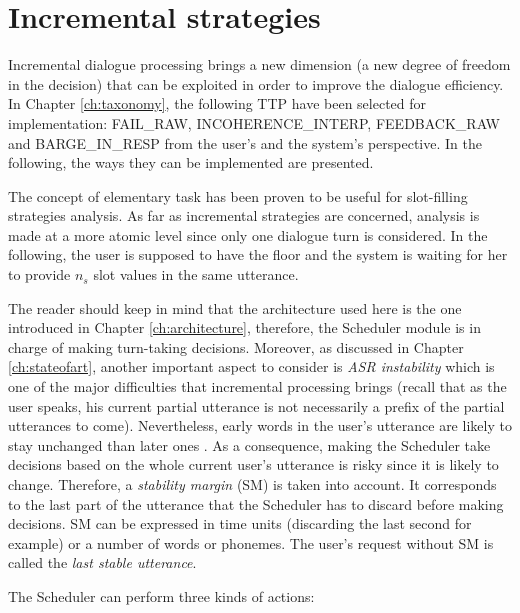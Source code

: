 \section{Incremental strategies}
\label{sec:incrstrat}

     Incremental dialogue processing brings a new dimension (a new degree of freedom in the decision) that can be exploited in order to improve the dialogue efficiency. In Chapter \ref{ch:taxonomy}, the following TTP have been selected for implementation: FAIL\_RAW, INCOHERENCE\_INTERP, FEEDBACK\_RAW and BARGE\_IN\_RESP from the user's and the system's perspective. In the following, the ways they can be implemented are presented.

     The concept of elementary task has been proven to be useful for slot-filling strategies analysis. As far as incremental strategies are concerned, analysis is made at a more atomic level since only one dialogue turn is considered. In the following, the user is supposed to have the floor and the system is waiting for her to provide $n_s$ slot values in the same utterance.

     The reader should keep in mind that the architecture used here is the one introduced in Chapter \ref{ch:architecture}, therefore, the Scheduler module is in charge of making turn-taking decisions. Moreover, as discussed in Chapter \ref{ch:stateofart}, another important aspect to consider is \textit{ASR instability} which is one of the major difficulties that incremental processing brings (recall that as the user speaks, his current partial utterance is not necessarily a prefix of the partial utterances to come). Nevertheless, early words in the user's utterance are likely to stay unchanged than later ones \cite{McGraw2012}. As a consequence, making the Scheduler take decisions based on the whole current user's utterance is risky since it is likely to change. Therefore, a \textit{stability margin} (SM) is taken into account. It corresponds to the last part of the utterance that the Scheduler has to discard before making decisions. SM can be expressed in time units (discarding the last second for example) or a number of words or phonemes. The user's request without SM is called the \textit{last stable utterance}.
		
		The Scheduler can perform three kinds of actions:

